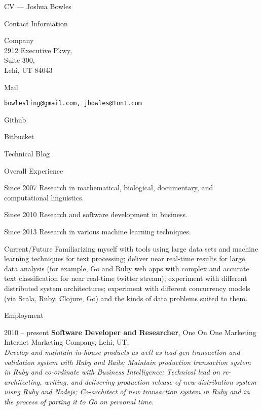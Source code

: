 \begin{cv}{CV --- Joshua Bowles}
\hfill
   
\begin{cvlist}{Contact Information}
	\item[Company] \\
				2912 Executive Pkwy,\\
				Suite 300,\\ 
				Lehi, UT 84043
\item[Mail]     \begin{verbatim}bowlesling@gmail.com, jbowles@1on1.com\end{verbatim}
\item[Github]			 
\item[Bitbucket]              
\item[Technical Blog]       
\end{cvlist}

\begin{cvlist}{Overall Experience}
\item[Since 2007] Research in mathematical, biological, documentary, and computational linguistics.
\item[Since 2010] Research and software development in business.
\item[Since 2013] Research in various machine learning techniques.
\item[Current/Future] Familiarizing myself with tools using large data sets and machine learning techniques for text processing; deliver near real-time results for large data analysis (for example, Go and Ruby web apps with complex and accurate text classification for near real-time twitter stream); experiment with different distributed system architectures; experiment with different concurrency models (via Scala, Ruby, Clojure, Go) and the kinds of data problems suited to them.
\end{cvlist}

\begin{cvlist}{Employment}
\item[2010 -- present] {\bf Software Developer and Researcher}, One On One Marketing\\
			Internet Marketing Company, Lehi, UT,\\
			\textsl{Develop and maintain in-house products as well as lead-gen transaction and validation system with Ruby and Rails;  Maintain production transaction system in Ruby and co-ordinate with Business Intelligence; Technical lead on re-architecting, writing, and delivering production release of new distribution system uisng Ruby and Nodejs; Co-architect of new transaction system in Ruby and in the process of porting it to Go on personal time.}
	

\end{cvlist}
\end{cv}
